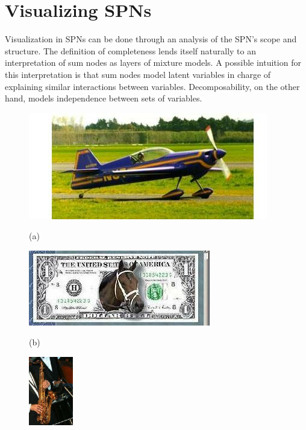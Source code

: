 \documentclass{article}
\begin{document}
\section{Visualizing SPNs}
\label{sec:visual}

Visualization in SPNs can be done through an analysis of the SPN's scope and structure. The
definition of completeness lends itself naturally to an interpretation of sum nodes as layers of
mixture models. A possible intuition for this interpretation is that sum nodes model latent
variables in charge of explaining similar interactions between variables. Decomposability, on the
other hand, models independence between sets of variables.

\begin{figure}[t]
  \centering
  \begin{minipage}[t]{.48\linewidth}
    \centering\centerline{\includegraphics[width=\linewidth]{imgs/airplane_sample.png}}
    \centerline{(a)}\medskip
  \end{minipage}
  \begin{minipage}[t]{.48\linewidth}
    \centering\centerline{\includegraphics[width=\linewidth]{imgs/dollar_sample.png}}
    \centerline{(b)}\medskip
  \end{minipage}
  \begin{minipage}[t]{.48\linewidth}
    \centering\centerline{\includegraphics[height=3cm]{imgs/sax_sample.png}}

\end{minipage}
\end{figure}
\end{document}

